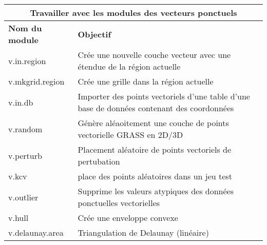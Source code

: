 \begin{table}[H]
\centering
 \begin{tabular}{|p{4cm}|p{10cm}|}
\hline \multicolumn{2}{|c|}{\textbf{Travailler avec les modules des vecteurs ponctuels}}\\
  \hline \textbf{Nom du module} & \textbf{Objectif} \\
  \hline v.in.region & Crée une nouvelle couche vecteur avec une étendue de la région actuelle\\
  \hline v.mkgrid.region & Crée une grille dans la région actuelle\\
  \hline v.in.db & Importer des points vectoriels d'une table d'une base de données contenant des coordonnées\\
  \hline v.random & Génère aléaoitement une couche de points vectorielle GRASS en 2D/3D\\
  \hline v.perturb & Placement aléatoire de points vectoriels de pertubation \\   
  \hline v.kcv & place des points aléatoires dans un jeu test\\
  \hline v.outlier & Supprime les valeurs atypiques des données ponctuelles vectorielles\\
  \hline v.hull & Crée une enveloppe convexe\\
  \hline v.delaunay.area & Triangulation de Delaunay (linéaire) \\

\end{tabular}
\end{table}
